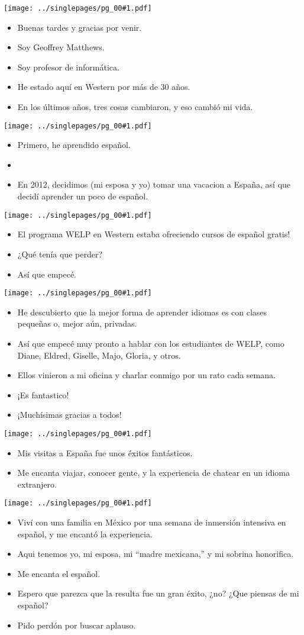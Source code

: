 \documentclass[12pt]{article}
\newcommand{\bi}{\begin{itemize}}
\newcommand{\ei}{\end{itemize}}
\newcommand{\cue}{\mbox{}
  \fbox{\sf Next slide}
}
\newcommand{\fig}[1]{
  \newpage  
  \begin{center}
    \texttt{[image: ../singlepages/pg\_00\#1.pdf]}
  \end{center}
  
}
\begin{document}
\Large


\fig{01}
\bi
\item Buenas tardes y gracias por venir.
\item Soy Geoffrey Matthews.
\item Soy  profesor de informática.
\item He estado aquí en Western por más de 30 años.
\item En los últimos años, tres cosas cambiaron, y eso cambió mi vida.
  \ei
  
\fig{03}

\bi
\item Primero, he aprendido español.
\item \cue
\item En 2012, decidimos (mi esposa y
yo) tomar una vacacion a España, así que decidí aprender un poco de
español.
\ei

\fig{04}

\bi
\item El programa WELP en Western estaba ofreciendo cursos de
  español gratis!
\item ¿Qué tenía que perder?
\item  Así que empecé.
\ei

\fig{05}

\bi
\item He descubierto que la mejor forma de aprender idiomas es con clases
  pequeñas o, mejor aún, privadas.
\item Así que empecé muy pronto a hablar
con los estudiantes de WELP, como Diane, Eldred, Giselle, Majo,
Gloria, y otros.
\item Ellos vinieron a mi oficina y charlar conmigo por un
  rato cada semana.
\item ¡Es fantastico!
\item ¡Muchísimas gracias a todos!
\ei

\fig{06}
\bi
\item Mis visitas a España fue unos éxitos fantásticos.
\item  Me encanta viajar,
conocer gente, y la experiencia de chatear en un idioma extranjero.
\ei

\fig{07}

\bi
\item Viví con una familia en México por una semana de inmersión intensiva
en español, y me encantó la experiencia.
\item
Aqui tenemos yo, mi esposa, mi ``madre mexicana,'' y mi sobrina
honorifica.  
\item
  Me encanta el español.
\item Espero que parezca que la resulta fue un gran
éxito, ¿no?  ¿Que piensas de mi español?
\item Pido perdón por buscar aplauso.
\ei
\end{document}
